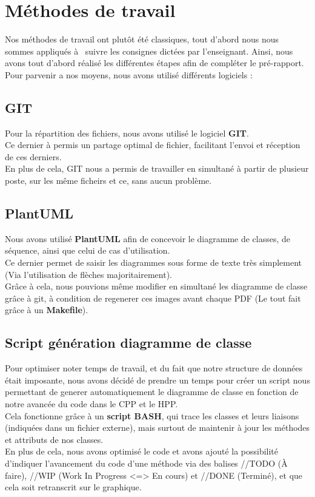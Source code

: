 \chapter{Méthodes de travail}
    Nos méthodes de travail ont plutôt été classiques, tout d'abord nous nous sommes 
    appliqués à  suivre les consignes dictées par l'enseignant. Ainsi, nous avons tout 
    d'abord réalisé les différentes étapes afin de compléter le pré-rapport.\\
    Pour parvenir a nos moyens, nous avons utilisé différents logiciels :
    \section{GIT}
        Pour la répartition des fichiers, nous avons utilisé le logiciel \textbf{GIT}.\\
        Ce dernier à permis un partage optimal de fichier, facilitant l'envoi et réception de ces derniers.\\
        En plus de cela, GIT nous a permis de travailler en simultané à partir de plusieur poste, sur les même ficheirs et ce, sans aucun problème.\\
    \section{PlantUML}
        Nous avons utilisé \textbf{PlantUML} afin de concevoir le diagramme de classes, de séquence, ainsi que celui de cas d'utilisation.\\
        Ce dernier permet de saisir les diagrammes sous forme de texte très simplement (Via l'utilisation de flèches majoritairement). \\
        Grâce à cela, nous pouvions même modifier en simultané les diagramme de classe grâce à git, à condition de regenerer ces images avant chaque PDF (Le tout fait grâce à un \textbf{Makefile}).\\
    \section{Script génération diagramme de classe}
        Pour optimiser noter temps de travail, et du fait que notre structure de données était imposante, nous avons décidé de prendre un temps pour créer un script nous permettant de generer automatiquement le diagramme de classe en fonction de notre avancée du code dans le CPP et le HPP.\\
        Cela fonctionne grâce à un \textbf{script BASH}, qui trace les classes et leurs liaisons (indiquées dans un fichier externe), mais surtout de maintenir à jour les méthodes et attributs de nos classes. \\
        En plus de cela, nous avons optimisé le code et avons ajouté la possibilité d'indiquer l'avancement du code d'une méthode via des balises //TODO (À faire), //WIP (Work In Progress <=> En cours) et //DONE (Terminé), et que cela soit retranscrit sur le graphique.
